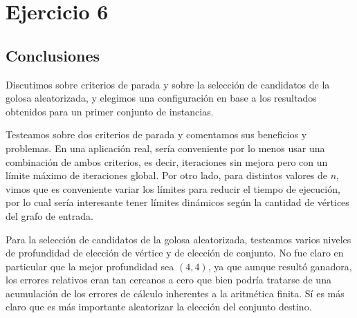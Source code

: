 \section{Ejercicio 6} %

\subsection{Conclusiones}

Discutimos sobre criterios de parada y sobre la selección de candidatos de la golosa aleatorizada, y elegimos una configuración en base a los resultados obtenidos para un primer conjunto de instancias.

Testeamos sobre dos criterios de parada y comentamos sus beneficios y problemas. En una aplicación real, sería conveniente por lo menos usar una combinación de ambos criterios, es decir, iteraciones sin mejora pero con un límite máximo de iteraciones global. Por otro lado, para distintos valores de $n$, vimos que es conveniente variar los límites para reducir el tiempo de ejecución, por lo cual sería interesante tener límites dinámicos según la cantidad de vértices del grafo de entrada.

Para la selección de candidatos de la golosa aleatorizada, testeamos varios niveles de profundidad de elección de vértice y de elección de conjunto. No fue claro en particular que la mejor profundidad sea $(4,4)$, ya que aunque resultó ganadora, los errores relativos eran tan cercanos a cero que bien podría tratarse de una acumulación de los errores de cálculo inherentes a la aritmética finita. Sí es más claro que es más importante aleatorizar la elección del conjunto destino.

